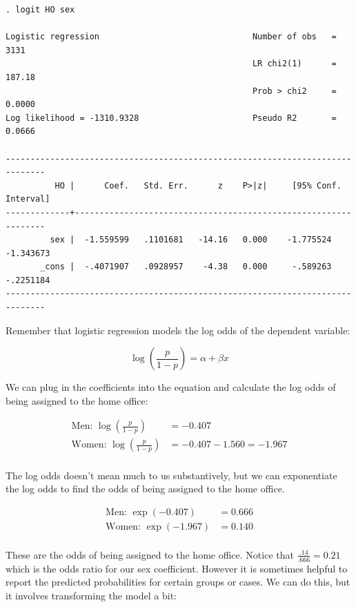 \documentclass[12pt]{amsart}
\begin{document}
\begin{verbatim}
. logit HO sex

Logistic regression                               Number of obs   =       3131
                                                  LR chi2(1)      =     187.18
                                                  Prob > chi2     =     0.0000
Log likelihood = -1310.9328                       Pseudo R2       =     0.0666

------------------------------------------------------------------------------
          HO |      Coef.   Std. Err.      z    P>|z|     [95% Conf. Interval]
-------------+----------------------------------------------------------------
         sex |  -1.559599   .1101681   -14.16   0.000    -1.775524   -1.343673
       _cons |  -.4071907   .0928957    -4.38   0.000     -.589263   -.2251184
------------------------------------------------------------------------------
\end{verbatim}

Remember that logistic regression models the log odds of the dependent variable:

\[ \log \left( \frac{p}{1-p} \right) = \alpha + \beta x \]

We can plug in the coefficients into the equation and calculate the log odds of being assigned to the home office:

\begin{align*}
\text{Men: } \log \left( \frac{p}{1-p} \right) &= -0.407\\
\text{Women: } \log \left( \frac{p}{1-p} \right) &= -0.407 - 1.560 = -1.967\\
\end{align*}

The log odds doesn't mean much to us substantively, but we can exponentiate the log odds to find the odds of being assigned to the home office.

\begin{align*}
\text{Men: }  \exp(-0.407) &= 0.666\\
\text{Women: } \exp(-1.967) &= 0.140\\
\end{align*}

These are the odds of being assigned to the home office. Notice that $\frac{.14}{.666} = 0.21$ which is the odds ratio for our sex coefficient. However it is sometimes helpful to report the predicted probabilities for certain groups or cases. We can do this, but it involves transforming the model a bit:
\end{document}
